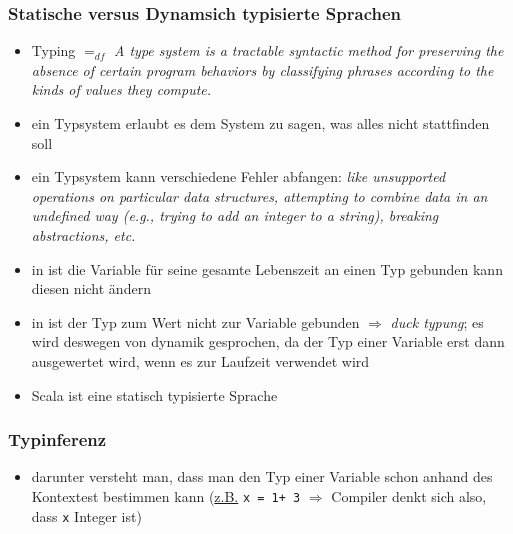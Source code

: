 \subsubsection{Statische versus Dynamsich typisierte Sprachen}
\begin{itemize}
  \item Typing $=_{df}$ \textit{A type system is a tractable syntactic method for preserving the absence of certain
program behaviors by classifying phrases according to the kinds of values they
compute.}

  \item ein Typsystem erlaubt es dem System zu sagen, was alles nicht
  stattfinden soll
  \item ein Typsystem kann verschiedene Fehler abfangen: \textit{like unsupported
operations on particular data structures, attempting to combine data in an undefined
way (e.g., trying to add an integer to a string), breaking abstractions, etc.
}
  \item in  ist die Variable für seine gesamte Lebenszeit an einen Typ gebunden \und kann diesen nicht ändern
  \item in  ist der Typ zum Wert \und 
  nicht zur Variable gebunden $\Rightarrow$ \textit{duck typung}; es wird
  deswegen von dynamik gesprochen, da der Typ einer Variable erst dann
  ausgewertet wird, wenn es zur Laufzeit verwendet wird
  \item Scala ist eine statisch typisierte Sprache
\end{itemize}


\subsubsection{Typinferenz}
\begin{itemize}
  \item darunter versteht man, dass man den Typ einer Variable schon anhand
  des Kontextest bestimmen kann (\uline{z.B.} \texttt{x = 1+ 3} $\Rightarrow$ 
  Compiler denkt sich also, dass \texttt{x} Integer ist)
\end{itemize}


%

